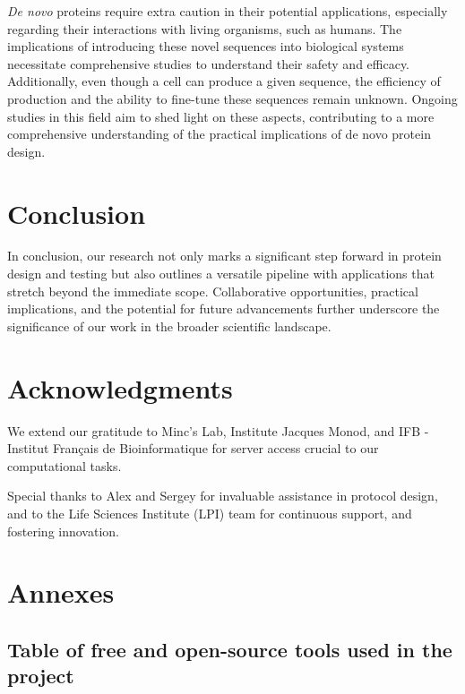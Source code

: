 \documentclass[11pt,a4paper]{article}
\begin{document}
\emph{De novo} proteins require extra caution in their potential applications, especially regarding their interactions with living organisms, such as humans. The implications of introducing these novel sequences into biological systems necessitate comprehensive studies to understand their safety and efficacy. Additionally, even though a cell can produce a given sequence, the efficiency of production and the ability to fine-tune these sequences remain unknown. Ongoing studies in this field aim to shed light on these aspects, contributing to a more comprehensive understanding of the practical implications of de novo protein design.

\section{Conclusion}

In conclusion, our research not only marks a significant step forward in protein design and testing but also outlines a versatile pipeline with applications that stretch beyond the immediate scope. Collaborative opportunities, practical implications, and the potential for future advancements further underscore the significance of our work in the broader scientific landscape.


\section*{Acknowledgments}

We extend our gratitude to Minc's Lab, Institute Jacques Monod, and IFB - Institut Français de Bioinformatique for server access crucial to our computational tasks.

Special thanks to Alex and Sergey for invaluable assistance in protocol design, and to the Life Sciences Institute (LPI) team for continuous support, and fostering innovation.


\printbibliography

\newpage

\section*{Annexes}

\subsection*{Table of free and open-source tools used in the project}
\end{document}
